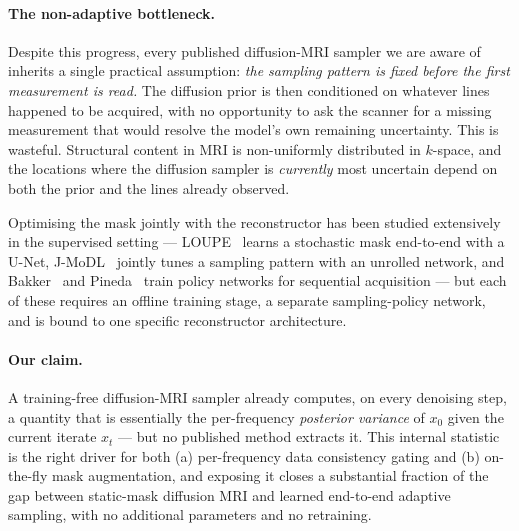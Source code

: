 \documentclass[conference]{IEEEtran}
\newcommand{\xz}{x_0}
\newcommand{\xt}{x_t}
\begin{document}
\paragraph{The non-adaptive bottleneck.} Despite this progress, every
published diffusion-MRI sampler we are aware of inherits a single
practical assumption: \emph{the sampling pattern is fixed before the
first measurement is read.} The diffusion prior is then conditioned on
whatever lines happened to be acquired, with no opportunity to ask the
scanner for a missing measurement that would resolve the model's own
remaining uncertainty. This is wasteful. Structural content in MRI is
non-uniformly distributed in $k$-space, and the locations where the
diffusion sampler is \emph{currently} most uncertain depend on both the
prior and the lines already observed.

Optimising the mask jointly with the reconstructor has been studied
extensively in the supervised setting --- LOUPE~\cite{bahadir2020loupe}
learns a stochastic mask end-to-end with a U-Net,
J-MoDL~\cite{aggarwal2020jmodl} jointly tunes a sampling pattern with
an unrolled network, and Bakker~\cite{bakker2020experimental} and
Pineda~\cite{pineda2020activerl} train policy networks for sequential
acquisition --- but each of these requires an offline training stage,
a separate sampling-policy network, and is bound to one specific
reconstructor architecture.

\paragraph{Our claim.} A training-free diffusion-MRI sampler already
computes, on every denoising step, a quantity that is essentially the
per-frequency \emph{posterior variance} of $\xz$ given the current
iterate $\xt$ --- but no published method extracts it. This internal
statistic is the right driver for both (a) per-frequency data
consistency gating and (b) on-the-fly mask augmentation, and exposing
it closes a substantial fraction of the gap between static-mask
diffusion MRI and learned end-to-end adaptive sampling, with no
additional parameters and no retraining.
\end{document}
